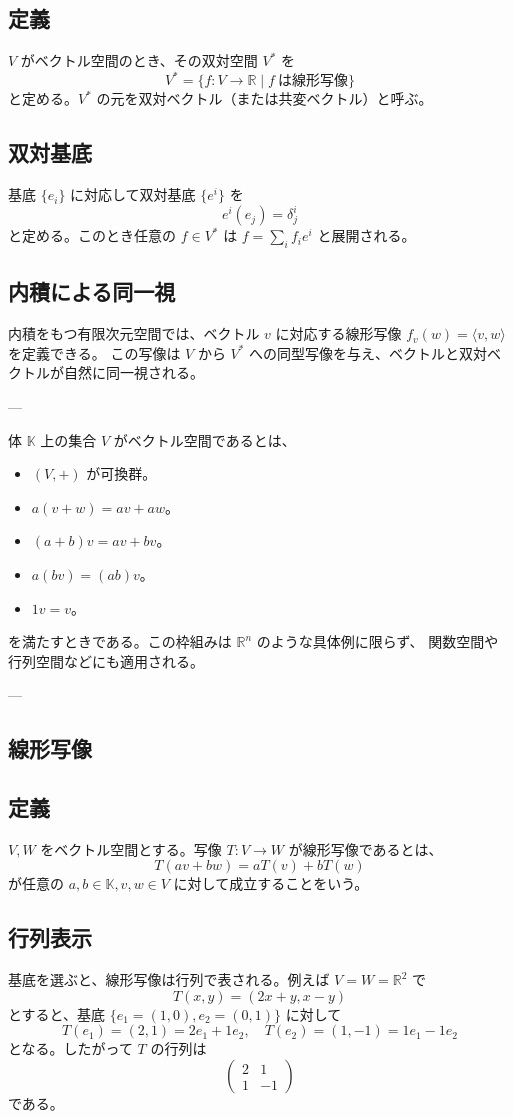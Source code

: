 \documentclass{ltjsarticle}
\begin{document}
\subsection{定義}
$V$ がベクトル空間のとき、その双対空間 $V^*$ を
\[
V^* = \{ f:V\to \mathbb{R}\mid f \ \text{は線形写像}\}
\]
と定める。$V^*$ の元を双対ベクトル（または共変ベクトル）と呼ぶ。

\subsection{双対基底}
基底 $\{e_i\}$ に対応して双対基底 $\{e^i\}$ を
\[
e^i(e_j)=\delta^i_j
\]
と定める。このとき任意の $f\in V^*$ は $f=\sum_i f_i e^i$ と展開される。

\subsection{内積による同一視}
内積をもつ有限次元空間では、ベクトル $v$ に対応する線形写像 $f_v(w)=\langle v,w\rangle$ を定義できる。
この写像は $V$ から $V^*$ への同型写像を与え、ベクトルと双対ベクトルが自然に同一視される。

---

体 $\mathbb{K}$ 上の集合 $V$ がベクトル空間であるとは、
\begin{itemize}
    \item $(V,+)$ が可換群。
    \item $a(v+w)=av+aw$。
    \item $(a+b)v=av+bv$。
    \item $a(bv)=(ab)v$。
    \item $1v=v$。
\end{itemize}
を満たすときである。この枠組みは $\mathbb{R}^n$ のような具体例に限らず、
関数空間や行列空間などにも適用される。

---

\subsection{線形写像}
\subsection{定義}
$V,W$ をベクトル空間とする。写像 $T:V\to W$ が線形写像であるとは、
\[
T(av+bw)=aT(v)+bT(w)
\]
が任意の $a,b\in \mathbb{K}, v,w\in V$ に対して成立することをいう。

\subsection{行列表示}
基底を選ぶと、線形写像は行列で表される。例えば $V=W=\mathbb{R}^2$ で
\[
T(x,y)=(2x+y, x-y)
\]
とすると、基底 $\{e_1=(1,0),e_2=(0,1)\}$ に対して
\[
T(e_1)=(2,1)=2e_1+1e_2,\quad T(e_2)=(1,-1)=1e_1-1e_2
\]
となる。したがって $T$ の行列は
\[
\begin{pmatrix}2&1\\1&-1\end{pmatrix}
\]
である。
\end{document}
